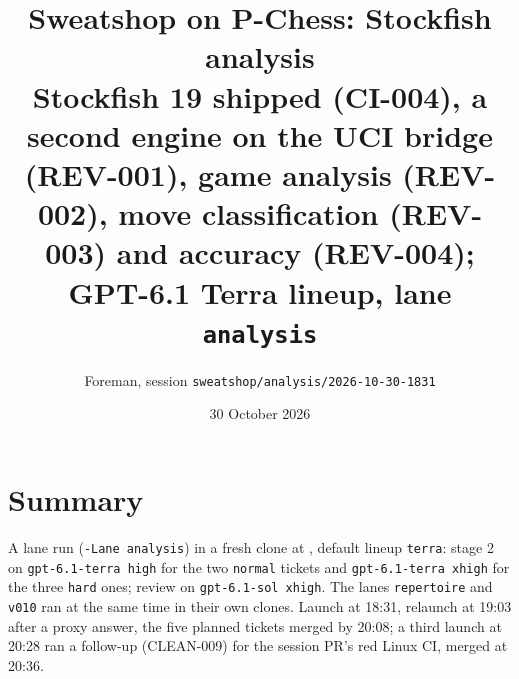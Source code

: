 \documentclass[11pt,a4paper]{article}
\title{Sweatshop on P-Chess: Stockfish analysis\\\large Stockfish 19 shipped (CI-004), a second engine on the UCI bridge (REV-001), game analysis (REV-002), move classification (REV-003) and accuracy (REV-004); GPT-6.1 Terra lineup, lane \texttt{analysis}}
\author{Foreman, session \texttt{sweatshop/analysis/2026-10-30-1831}}
\date{30 October 2026}
\begin{document}
\maketitle

\section*{Summary}

A lane run (\texttt{-Lane analysis}) in a fresh clone at ,
default lineup \texttt{terra}: stage 2 on \texttt{gpt-6.1-terra high} for the two
\texttt{normal} tickets and \texttt{gpt-6.1-terra xhigh} for the three \texttt{hard} ones; review
on \texttt{gpt-6.1-sol xhigh}. The lanes \texttt{repertoire} and \texttt{v010} ran at the same time
in their own clones. Launch at 18:31, relaunch at 19:03 after a proxy answer, the five planned
tickets merged by 20:08; a third launch at 20:28 ran a follow-up (CLEAN-009) for the session PR's
red Linux CI, merged at 20:36.
\end{document}
